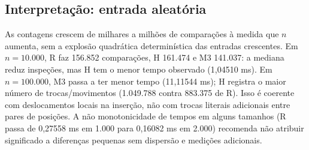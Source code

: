 \subsection*{Interpretação: entrada aleatória}
As contagens crescem de milhares a milhões de comparações à medida que $n$ aumenta, sem a explosão quadrática determinística das entradas crescentes. Em $n=10.000$, R faz 156.852 comparações, H 161.474 e M3 141.037: a mediana reduz inspeções, mas H tem o menor tempo observado (1,04510 ms). Em $n=100.000$, M3 passa a ter menor tempo (11,11544 ms); H registra o maior número de trocas/movimentos (1.049.788 contra 883.375 de R). Isso é coerente com deslocamentos locais na inserção, não com trocas literais adicionais entre pares de posições. A não monotonicidade de tempos em alguns tamanhos (R passa de 0,27558 ms em 1.000 para 0,16082 ms em 2.000) recomenda não atribuir significado a diferenças pequenas sem dispersão e medições adicionais.
